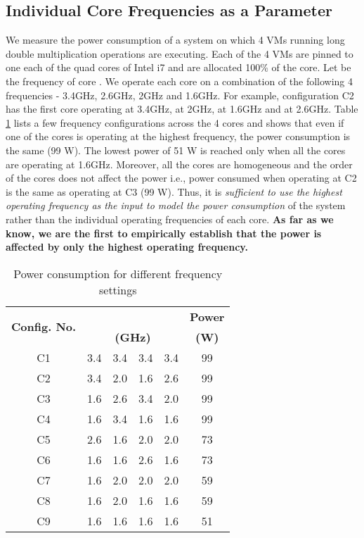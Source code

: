 \documentclass{sig-alternate}
\begin{document}
\subsection{Individual Core Frequencies as a Parameter}
We measure the power consumption of a system on which 4 VMs running long double multiplication operations are executing. Each of the 4 VMs are pinned to one each of the quad cores of Intel i7 and are allocated 100\% of the core. Let  be the frequency of core . We operate each core on a combination of the following 4 frequencies - 3.4GHz, 2.6GHz, 2GHz and 1.6GHz. For example, configuration C2 has the first core  operating at 3.4GHz,  at 2GHz,  at 1.6GHz and  at 2.6GHz. Table \ref{corefi7} lists a few frequency configurations across the 4 cores and shows that even if one of the cores is operating at the highest frequency, the power consumption is the same (99 W). The lowest power of 51 W is reached only when all the cores are operating at 1.6GHz. Moreover, all the cores are homogeneous and the order of the cores does not affect the power i.e., power consumed when operating at C2 is the same as operating at C3 (99 W). Thus, it is \emph{sufficient to use the highest operating frequency as the input to model the power consumption} of the system rather than the individual operating frequencies of each core. \textbf{As far as we know, we are the first to empirically establish that the power is affected by only the highest operating frequency.}
\begin{table}[!htbp]
\vspace{-0.5cm}
\caption{Power consumption for different frequency settings}
\begin{center}
\begin{tabular}{|c||c|c|c|c||c|}
\hline
\multirow{2}{*}{\textbf{Config. No.}}	&	\textbf{}	&	\textbf{}	&	\textbf{}	&	\textbf{}	&	\textbf{Power}\\ \cline{2-6}
& \multicolumn{4}{c||}{\textbf{(GHz)}} & \textbf{(W)} \\ \hline
C1	&	3.4	&	3.4	&	3.4	&	3.4	&	99	\\ \hline
C2	&	3.4	&	2.0	&	1.6	&	2.6	&	99	\\ \hline
C3	&	1.6	&	2.6	&	3.4	&	2.0	&	99	\\ \hline
C4	&	1.6	&	3.4	&	1.6	&	1.6	&	99	\\ \hline
C5	&	2.6	&	1.6	&	2.0	&	2.0	&	73	\\ \hline
C6	&	1.6	&	1.6	&	2.6	&	1.6	&	73	\\ \hline
C7	&	1.6	&	2.0	&	2.0	&	2.0	&	59	\\ \hline
C8	&	1.6	&	2.0	&	1.6	&	1.6	&	59	\\ \hline
C9	&	1.6	&	1.6	&	1.6	&	1.6	&	51	\\ \hline
\end{tabular}
\end{center}
\vspace{-0.5cm}
\label{corefi7}
\end{table}
\end{document}
